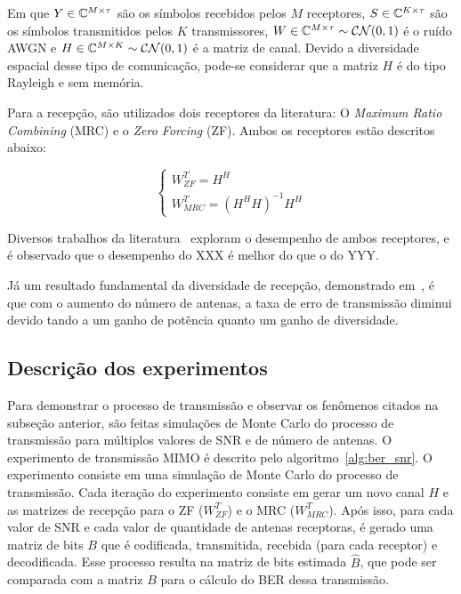 \documentclass{article}
\begin{document}
Em que $Y\in\mathbb{C}^{M\times\tau}$ são os símbolos recebidos pelos $M$ receptores, $S\in\mathbb{C}^{K\times\tau}$ são os símbolos transmitidos pelos $K$ transmissores, $W\in\mathbb{C}^{M\times\tau}\sim\mathcal{C}\mathcal{N}(0,1)$ é o ruído AWGN e $H\in\mathbb{C}^{M\times K}\sim\mathcal{C}\mathcal{N}(0,1)$ é a matriz de canal. Devido a diversidade espacial desse tipo de comunicação, pode-se considerar que a matriz $H$ é do tipo Rayleigh e sem memória. 

Para a recepção, são utilizados dois receptores da literatura: O \textit{Maximum Ratio Combining} (MRC) e o \textit{Zero Forcing} (ZF). Ambos os receptores estão descritos abaixo: 

\begin{equation}
\begin{cases}
    W^T_{ZF} = H^H \\
    W^T_{MRC} = (H^HH)^{-1}H^H
\end{cases}
\end{equation}

Diversos trabalhos da literatura~\cite{} exploram o desempenho de ambos receptores, e é observado que o desempenho do XXX é melhor do que o do YYY. 

Já um resultado fundamental da diversidade de recepção, demonstrado em~\cite[eq. 3.70 e 3.71]{tse.viswanath_2005}, é que com o aumento do número de antenas, a taxa de erro de transmissão diminui devido tando a um ganho de potência quanto um ganho de diversidade. 

\subsection{Descrição dos experimentos}

Para demonstrar o processo de transmissão e observar os fenômenos citados na subseção anterior, são feitas simulações de Monte Carlo do processo de transmissão para múltiplos valores de SNR e de número de antenas. O experimento de transmissão MIMO é descrito pelo algoritmo~\ref{alg:ber_snr}. O experimento consiste em uma simulação de Monte Carlo do processo de transmissão. Cada iteração do experimento consiste em gerar um novo canal $H$ e as matrizes de recepção para o ZF ($W^T_{ZF}$) e o MRC ($W^T_{MRC}$). Após isso, para cada valor de SNR e cada valor de quantidade de antenas receptoras, é gerado uma matriz de bits $B$ que é codificada, transmitida, recebida (para cada receptor) e decodificada. Esse processo resulta na matriz de bits estimada $\hat{B}$, que pode ser comparada com a matriz $B$ para o cálculo do BER dessa transmissão. 
\end{document}
